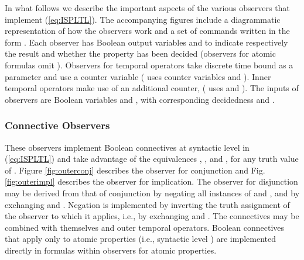 \documentclass{llncs}
\begin{document}
In what follows we describe the important aspects of the various observers
that implement (\ref{eq:ISPLTL}). The accompanying figures include
a diagrammatic representation of how the observers work and a set
of commands written in the form .
Each observer has Boolean output variables  and  to indicate
respectively the result and whether the property has been decided
(observers for atomic formulas omit ). Observers for temporal
operators take discrete time bound  as a parameter and use a counter
variable  ( uses counter variables  and ).
Inner temporal operators make use of an additional counter,  (
uses  and ). The inputs of observers are Boolean variables
 and , with corresponding decidedness  and .


\subsubsection*{Connective Observers}

These observers implement Boolean connectives at syntactic level 
in (\ref{eq:ISPLTL}) and take advantage of the equivalences ,
, 
and , for any truth
value of . Figure \ref{fig:outerconj} describes the
observer for conjunction and Fig. \ref{fig:outerimpl} describes the
observer for implication. The observer for disjunction may be derived
from that of conjunction by negating all instances of  and ,
and by exchanging  and .
Negation is implemented by inverting the truth assignment of the observer
to which it applies, i.e., by exchanging 
and . The connectives may be combined
with themselves and outer temporal operators. Boolean connectives
that apply only to atomic properties (i.e., syntactic level )
are implemented directly in formulas within observers for atomic properties.
\end{document}
